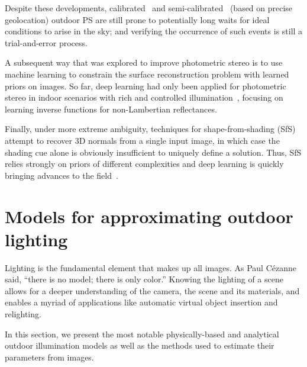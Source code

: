Despite these developments, calibrated~\cite{yu-iccp-13} and semi-calibrated~\cite{jung-cvpr-15} (based on precise geolocation) outdoor PS are still prone to potentially long waits for ideal conditions to arise in the sky; and verifying the occurrence of such events is still a trial-and-error process.

A subsequent way that was explored to improve photometric stereo is to use machine learning to constrain the surface reconstruction problem with learned priors on images. So far, deep learning had only been applied for photometric stereo in indoor scenarios with rich and controlled illumination~\cite{yu-iccv-17,santo-iccv-17,taniai-arxiv-18,shi-tpami-18}, focusing on learning inverse functions for non-Lambertian reflectances.



Finally, under more extreme ambiguity, techniques for shape-from-shading (SfS)~\cite{Horn1989,Zhang1999,Langer1994,oxholm-eccv-12,johnson-cvpr-11,barron-pami-15} attempt to recover 3D normals from a single input image, in which case the shading cue alone is obviously insufficient to uniquely define a solution. Thus, SfS relies strongly on priors of different complexities and deep learning is quickly bringing advances to the field~\cite{eigen-iccv-15,shu-cvpr-17,wu-nips-17,shu-cvpr-17}.


\section{Models for approximating outdoor lighting}

Lighting is the fundamental element that makes up all images. As Paul Cézanne said, ``there is no model; there is only color.'' Knowing the lighting of a scene allows for a deeper understanding of the camera, the scene and its materials, and enables a myriad of applications like automatic virtual object insertion and relighting.

In this section, we present the most notable physically-based and analytical outdoor illumination models as well as the methods used to estimate their parameters from images.

